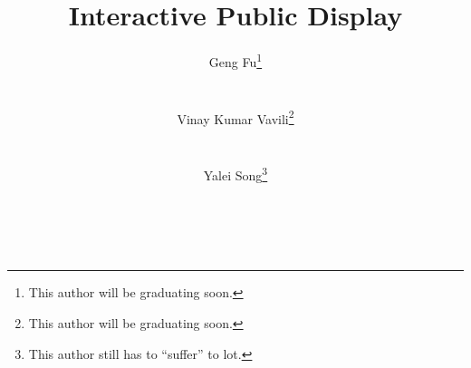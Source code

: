 \documentclass{sig-alternate}
\begin{document}
\title{Interactive Public Display}
%
%
%
%
%

%
\author{
%
%
Geng Fu\thanks{This author will be graduating soon.}\\
	\\
	\\
\alignauthor
Vinay Kumar Vavili\thanks{This author will be graduating soon.}\\
	\\
	\\
\alignauthor
Yalei Song\thanks{This author still has to ``suffer'' to lot.}\\
	\\
	\\
}
\end{document}

